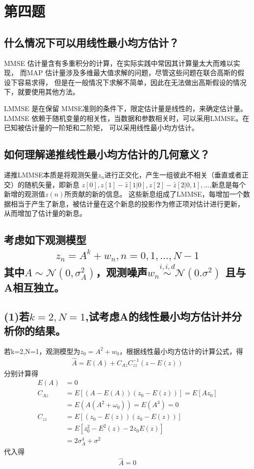 \documentclass[fontset=windows]{article}
\numberwithin{figure}{section}
\begin{document}
\section{第四题}
\subsection*{什么情况下可以用线性最小均方估计？}

MMSE 估计量含有多重积分的计算，在实际实践中常因其计算量太大而难以实现，
而MAP 估计量涉及多维最大值求解的问题，尽管这些问题在联合高斯的假设下容易求得，
但是在一般情况下求解不简单，因此在无法做出高斯假设的情况下，就要使用其他方法。

LMMSE 是在保留 MMSE准则的条件下，限定估计量是线性的，来确定估计量。
LMMSE 依赖于随机变量的相关性，当数据和参数相关时，可以采用LMMSE。在已知被估计量的一阶矩和二阶矩，
可以采用线性最小均方估计。

\subsection*{如何理解递推线性最小均方估计的几何意义？}

递推LMMSE本质是将观测矢量\(z_n\)进行正交化，产生一组彼此不相关（垂直或者正交）的随机矢量，即新息
\(z[0],z[1]-\hat{z} [1|0],z[2]-\hat{z}[2|0,1],\dots \),新息是每个新增的观测值\(z(n)\)所贡献的新的信息。
这些新息组成了LMMSE，每增加一个数据相当于产生了新息，被估计量在这个新息的投影作为修正项对估计进行更新，
从而增加了估计量的新息。

\subsection*{考虑如下观测模型
	\begin{align*}
		z_n=A^k+w_n,n=0,1,\dots,N-1
	\end{align*}
	其中\(A\sim \mathcal{N}(0,\sigma^2_A)\)，观测噪声\(w_n\overset{i,i,d}{\sim}\mathcal{N}(0.\sigma^2)\)
	且与A相互独立。}
\subsection*{(1)若\(k=2,N=1\),试考虑A的线性最小均方估计并分析你的结果。}

若k=2,N=1，观测模型为\(z_0=A^2+w_0\)，根据线性最小均方估计的计算公式，得
\begin{align*}
	\hat{A}=E(A)+C_{Az}C_{zz}^{-1}(z-E(z))
\end{align*}
分别计算得
\begin{align*}
	E(A)   & =0                             \\
	C_{Az} & =E[(A-E(A))(z_0-E(z))]=E[Az_0] \\
	       & =E(A(A^2+\omega_0))=E(A^3)=0   \\
	C_{zz} & =E[(z_0-E(z))(z_0-E(z))]       \\
	       & =E[z_0^2-E^2(z)-2z_0E(z)]      \\
	       & =2\sigma_A^4+\sigma^2
\end{align*}
代入得
\begin{align*}
	\hat{A}=0
\end{align*}
\end{document}
